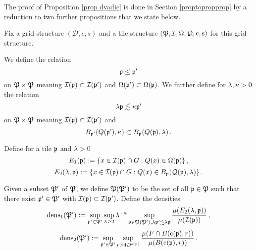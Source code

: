 






The proof of Proposition \ref{prop dyadic} is done in Section \ref{proptopropprop}
by a reduction to two further propositions that we state below.


Fix a grid structure  $(\mathcal{D}, c, s)$  and a tile structure $(\mathfrak P,\mathcal{I},\Omega,\mathcal{Q},\mathrm{c},\mathrm{s})$
for this grid structure.

We define the relation
\begin{equation}\label{straightorder}
    \mathfrak p\le \mathfrak p'
\end{equation}
    on $\mathfrak P\times \mathfrak P$ meaning
$\mathcal{I}(\mathfrak p)\subset \mathcal{I}(\mathfrak p')$ and
$\Omega(\mathfrak p')\subset \Omega(\mathfrak p)$.
We further define for $\lambda,\kappa>0$
the relation
\begin{equation}\label{wiggleorder}
    \lambda \mathfrak p \lesssim \kappa\mathfrak p'
\end{equation}
on $\mathfrak P\times \mathfrak P$ meaning
$\mathcal{I}(\mathfrak p)\subset \mathcal{I}(\mathfrak p')$ and
\begin{equation}
    B_{\mathfrak p'}(Q(\mathfrak p'),\kappa )
    \subset B_{\mathfrak p}(Q(\mathfrak p),\lambda )\, .
\end{equation}



Define for a tile $\mathfrak p$ and $\lambda>0$
\begin{equation}\label{definee1}
    E_1(\mathfrak p):=\{x\in \mathcal{I}(\mathfrak p)\cap G: {Q}(x)\in \Omega(\mathfrak p)\}\, ,
\end{equation}
\begin{equation}\label{definee2}
    E_2(\lambda, \mathfrak p):=\{x\in \mathcal{I}(\mathfrak p)\cap G: {Q}(x)\in B_{\mathfrak p}(\mathcal{Q}(\mathfrak p), \lambda)\}\, .
\end{equation}



Given a subset $\mathfrak P'$ of $\mathfrak P$, we define
$\mathfrak P(\mathfrak P')$ to be the set of
all $\mathfrak p \in \mathfrak P$ such that there exist $\mathfrak p' \in \mathfrak P'$ with $\mathcal{I}(\mathfrak p)\subset \mathcal{I}(\mathfrak p')$. Define  the densities
\begin{equation}\label{definedens1}
    {\operatorname{\operatorname{dens}}}_1(\mathfrak P') := \sup_{\mathfrak p'\in \mathfrak P'}\sup_{\lambda \geq 2} \lambda^{-a} \sup_{\mathfrak p \in \mathfrak P(\mathfrak P'), \lambda \mathfrak p' \lesssim \lambda \mathfrak p}
    \frac{\mu({E}_2(\lambda, \mathfrak p))}{\mu(\mathcal{I}(\mathfrak p))}\, ,
\end{equation}
\begin{equation}\label{definedens2}
    {\operatorname{\operatorname{dens}}}_2(\mathfrak P') := \sup_{\mathfrak p'\in \mathfrak P'}
    \sup_{r>4D^{\mathrm{s}(\mathfrak p)}}
    \frac{\mu(F\cap B(\mathrm{c}(\mathfrak p),r))}{\mu(B(\mathrm{c}(\mathfrak p),r))}\, .
\end{equation}





